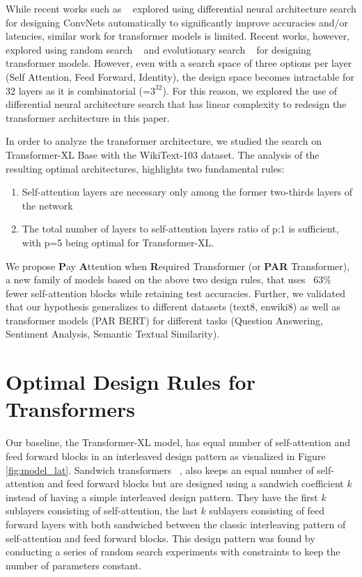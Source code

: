 \documentclass[11pt]{article}
\begin{document}
While recent works such as ~\citep{fbnet,fbnet2,darts} explored using differential neural architecture search for designing ConvNets automatically to significantly improve accuracies and/or latencies, similar work for transformer models is limited. Recent works, however, explored using random search ~\citep{SandwichTransformer} and evolutionary search ~\citep{hwawaretrans,evolvedtrans} for designing transformer models. However, even with a search space of three options per layer (Self Attention, Feed Forward, Identity), the design space becomes intractable for 32 layers as it is combinatorial (=$3^{32}$). For this reason, we explored the use of differential neural architecture search that has linear complexity to redesign the transformer architecture in this paper.

In order to analyze the transformer architecture, we studied the search on Transformer-XL Base with the WikiText-103 dataset. The analysis of the resulting optimal architectures, highlights two fundamental rules:

\begin{enumerate}
    \item Self-attention layers are necessary only among the former two-thirds layers of the network
    \item The total number of layers to self-attention layers ratio of p:1 is sufficient, with p=5 being optimal for Transformer-XL.
\end{enumerate}

We propose \textbf{P}ay \textbf{A}ttention when \textbf{R}equired Transformer (or \textbf{PAR} Transformer), a new family of models based on the above two design rules, that uses ~63\% fewer self-attention blocks while retaining test accuracies. Further, we validated that our hypothesis generalizes to different datasets (text8, enwiki8) as well as transformer models (PAR BERT) for different tasks (Question Answering, Sentiment Analysis, Semantic Textual Similarity).

\section{Optimal Design Rules for Transformers}

Our baseline, the Transformer-XL model, has equal number of self-attention and feed forward blocks in an interleaved design pattern as visualized in Figure \ref{fig:model_lat}. Sandwich transformers ~\citep{SandwichTransformer}, also keeps an equal number of self-attention and feed forward blocks but are designed using a sandwich coefficient $k$ instead of having a simple interleaved design pattern. They have the first $k$ sublayers consisting of self-attention, the last $k$ sublayers consisting of feed forward layers with both sandwiched between the classic interleaving pattern of self-attention and feed forward blocks. This design pattern was found by conducting a series of random search experiments with constraints to keep the number of parameters constant. 
\end{document}
